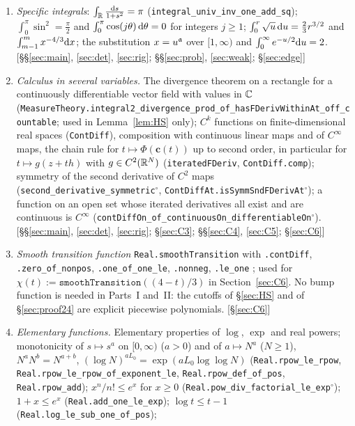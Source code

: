 \begin{enumerate}[leftmargin=2em,itemsep=1pt]
\item \emph{Specific integrals}: $\int_{\mathbb{R}}\frac{\mathrm{d} s}{1+s^2}=\pi$ (\texttt{integral\_univ\_inv\_one\_add\_sq}); $\int_0^\pi\sin^2=\frac\pi2$ and $\int_0^\pi\cos(j\theta)\,\mathrm{d}\theta=0$ for integers $j\ge1$;
$\int_0^r\sqrt u\,\mathrm{d} u=\frac23r^{3/2}$ and $\int_{m-1}^mx^{-4/3}\mathrm{d} x$; the substitution $x=u^{\mathfrak{a}}$ over $[1,\infty)$ and $\int_0^\infty e^{-u/2}\mathrm{d} u=2$. \hfill[\S\S\ref{sec:main}, \ref{sec:det}, \ref{sec:rig}; \S\S\ref{sec:prob}, \ref{sec:weak}; \S\ref{sec:edge}]
\item \emph{Calculus in several variables.} The divergence theorem on a rectangle for a continuously differentiable vector field with values in $\mathbb{C}$
(\texttt{MeasureTheory.integral2\_divergence\_prod\_of\_hasFDerivWithinAt\_off\_countable}; used in Lemma~\ref{lem:HS} only); $C^k$ functions on finite-dimensional real spaces (\texttt{ContDiff}), composition with
continuous linear maps and of $C^\infty$ maps, the chain rule for $t\mapsto\Phi(\mathbf c(t))$ up to second order, in particular for $t\mapsto g(z+th)$ with $g\in C^2(\mathbb{R}^N)$ (\texttt{iteratedFDeriv},
\texttt{ContDiff.comp}); symmetry of the second derivative of $C^2$ maps (\texttt{second\_derivative\_symmetric}$^\circ$, \texttt{ContDiffAt.isSymmSndFDerivAt}$^\circ$); a function on an open set whose
iterated derivatives all exist and are continuous is $C^\infty$ (\texttt{contDiffOn\_of\_continuousOn\_differentiableOn}$^\circ$). \hfill[\S\S\ref{sec:main}, \ref{sec:det}, \ref{sec:rig}; \S\ref{sec:C3}; \S\S\ref{sec:C4}, \ref{sec:C5}; \S\ref{sec:C6}]
\item \emph{Smooth transition function} \texttt{Real.smoothTransition} with \texttt{.contDiff}, \texttt{.zero\_of\_nonpos}, \texttt{.one\_of\_one\_le}, \texttt{.nonneg}, \texttt{.le\_one} ; used for $\chi(t):=\texttt{smoothTransition}((4-t)/3)$ in Section~\ref{sec:C6}. No bump function is needed in Parts~I and~II: the cutoffs of \S\ref{sec:HS}
and of \S\ref{sec:proof24} are explicit piecewise polynomials. \hfill[\S\ref{sec:C6}]
\item \emph{Elementary functions.} Elementary properties of $\log$, $\exp$ and real powers; monotonicity of $s\mapsto s^a$ on $[0,\infty)$ ($a>0$) and of $a\mapsto N^a$ ($N\ge1$), $N^aN^b=N^{a+b}$,
$(\log N)^{aL_0}=\exp(aL_0\log\log N)$ (\texttt{Real.rpow\_le\_rpow}, \texttt{Real.rpow\_le\_rpow\_of\_exponent\_le}, \texttt{Real.rpow\_def\_of\_pos}, \texttt{Real.rpow\_add});
$x^n/n!\le e^x$ for $x\ge0$ (\texttt{Real.pow\_div\_factorial\_le\_exp}$^\circ$); $1+x\le e^x$ (\texttt{Real.add\_one\_le\_exp}); $\log t\le t-1$ (\texttt{Real.log\_le\_sub\_one\_of\_pos});

\end{enumerate}

